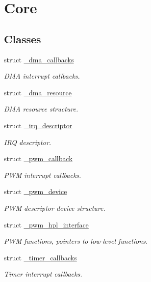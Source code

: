 \hypertarget{group___h_p_l}{}\section{Core}
\label{group___h_p_l}
\subsection*{Classes}
\begin{DoxyCompactItemize}
\item 
struct \hyperlink{struct__dma__callbacks}{\+\_\+dma\+\_\+callbacks}
\begin{DoxyCompactList}\small\item\em D\+MA interrupt callbacks. \end{DoxyCompactList}\item 
struct \hyperlink{struct__dma__resource}{\+\_\+dma\+\_\+resource}
\begin{DoxyCompactList}\small\item\em D\+MA resource structure. \end{DoxyCompactList}\item 
struct \hyperlink{struct__irq__descriptor}{\+\_\+irq\+\_\+descriptor}
\begin{DoxyCompactList}\small\item\em I\+RQ descriptor. \end{DoxyCompactList}\item 
struct \hyperlink{struct__pwm__callback}{\+\_\+pwm\+\_\+callback}
\begin{DoxyCompactList}\small\item\em P\+WM interrupt callbacks. \end{DoxyCompactList}\item 
struct \hyperlink{struct__pwm__device}{\+\_\+pwm\+\_\+device}
\begin{DoxyCompactList}\small\item\em P\+WM descriptor device structure. \end{DoxyCompactList}\item 
struct \hyperlink{struct__pwm__hpl__interface}{\+\_\+pwm\+\_\+hpl\+\_\+interface}
\begin{DoxyCompactList}\small\item\em P\+WM functions, pointers to low-\/level functions. \end{DoxyCompactList}\item 
struct \hyperlink{struct__timer__callbacks}{\+\_\+timer\+\_\+callbacks}
\begin{DoxyCompactList}\small\item\em Timer interrupt callbacks. \end{DoxyCompactList}\item 

\end{DoxyCompactItemize}

